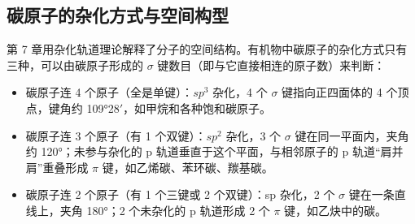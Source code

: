 \documentclass[UTF8,a4paper,zihao=5,oneside,openany,fontset=none]{ctexbook}
\def\sigma{σ}\def\pi{π}\def\Delta{Δ}\def\alpha{α}\def\beta{β}%
\def\mathrm#1{#1}\def\text#1{#1}\def\ensuremath#1{#1}\def\ce#1{#1}%
\begin{document}
\subsection{碳原子的杂化方式与空间构型}
第 7 章用杂化轨道理论解释了分子的空间结构。有机物中碳原子的杂化方式只有三种，可以由碳原子形成的 $\sigma$ 键数目（即与它直接相连的原子数）来判断：
\begin{itemize}
\item 碳原子连 4 个原子（全是单键）：$\mathrm{sp}^3$ 杂化，4 个 $\sigma$ 键指向正四面体的 4 个顶点，键角约 109°28$'$，如甲烷和各种饱和碳原子。
\item 碳原子连 3 个原子（有 1 个双键）：$\mathrm{sp}^2$ 杂化，3 个 $\sigma$ 键在同一平面内，夹角约 120°；未参与杂化的 p 轨道垂直于这个平面，与相邻原子的 p 轨道“肩并肩”重叠形成 $\pi$ 键，如乙烯碳、苯环碳、羰基碳。
\item 碳原子连 2 个原子（有 1 个三键或 2 个双键）：sp 杂化，2 个 $\sigma$ 键在一条直线上，夹角 180°；2 个未杂化的 p 轨道形成 2 个 $\pi$ 键，如乙炔中的碳。
\end{itemize}
\end{document}
